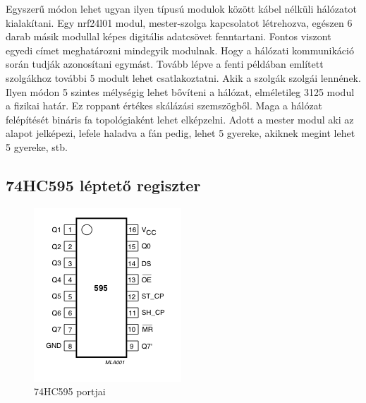 \documentclass[a4paper,12pt]{article}
\begin{document}
Egyszerű módon lehet ugyan ilyen típusú modulok között kábel nélküli hálózatot kialakítani.
Egy nrf24l01 modul, mester-szolga kapcsolatot létrehozva, egészen 6 darab másik modullal képes digitális adatcsövet fenntartani.
Fontos viszont egyedi címet meghatározni mindegyik modulnak. Hogy a hálózati kommunikáció során tudják azonosítani egymást.
Tovább lépve a fenti példában említett szolgákhoz további 5 modult lehet csatlakoztatni. 
Akik a szolgák szolgái lennének. Ilyen módon 5 szintes mélységig lehet bővíteni a hálózat, elméletileg 3125 modul a fizikai határ.
Ez roppant értékes skálázási szemszögből. Maga a hálózat felépítését bináris fa topológiaként lehet elképzelni.
Adott a mester modul aki az alapot jelképezi, lefele haladva a fán pedig, lehet 5 gyereke, akiknek megint lehet 5 gyereke, stb.

\subsection{74HC595 léptető regiszter}\label{sec:shiftregister}

\begin{figure}
	\vspace{-20pt}
    \centering
    \includegraphics[scale=1]{images/74HC595_pinlayout.png}
    \caption[74HC595 portjai]{74HC595 portjai}
    \label{fig:shiftregister}
\end{figure}
\end{document}
